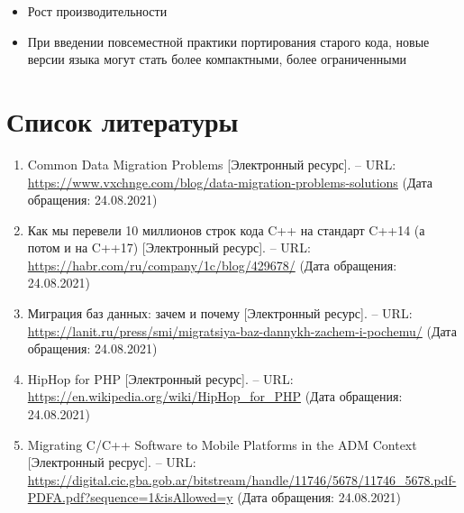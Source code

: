 \documentclass{article}
\begin{document}
	\begin{itemize}
		\item{Рост производительности}
		\item{При введении повсеместной практики портирования старого кода, новые версии языка могут стать более компактными, более ограниченными}
	\end{itemize}


	\section{Список литературы}

	

	\begin{enumerate}
		\item{Common Data Migration Problems [Электронный ресурс]. -- URL: \url{https://www.vxchnge.com/blog/data-migration-problems-solutions} (Дата обращения: 24.08.2021)}
		\item{Как мы перевели 10 миллионов строк кода C++ на стандарт C++14 (а потом и на C++17) [Электронный ресурс]. -- URL: \url{https://habr.com/ru/company/1c/blog/429678/} (Дата обращения: 24.08.2021)}
		\item{Миграция баз данных: зачем и почему [Электронный ресурс]. -- URL:  \url{https://lanit.ru/press/smi/migratsiya-baz-dannykh-zachem-i-pochemu/} (Дата обращения: 24.08.2021)}
		\item{HipHop for PHP [Электронный ресурс]. -- URL: \url{https://en.wikipedia.org/wiki/HipHop_for_PHP} (Дата обращения: 24.08.2021)}
		\item{Migrating C/C++ Software to Mobile Platforms in the ADM Context [Электронный ресрус]. -- URL: \url{https://digital.cic.gba.gob.ar/bitstream/handle/11746/5678/11746_5678.pdf-PDFA.pdf?sequence=1&isAllowed=y} (Дата обращения: 24.08.2021)}


\end{enumerate}
\end{document}
